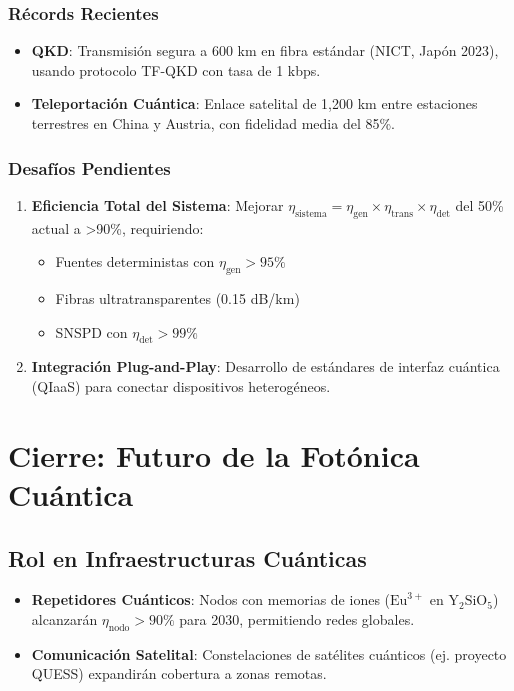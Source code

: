 \documentclass{article}
\begin{document}
\subsubsection*{Récords Recientes}

\begin{itemize}
    \item \textbf{QKD}: Transmisión segura a 600 km en fibra estándar (NICT, Japón 2023), usando protocolo TF-QKD con tasa de 1 kbps.
    \item \textbf{Teleportación Cuántica}: Enlace satelital de 1,200 km entre estaciones terrestres en China y Austria, con fidelidad media del 85\%.
\end{itemize}

\subsubsection*{Desafíos Pendientes}

\begin{enumerate}
    \item \textbf{Eficiencia Total del Sistema}: Mejorar $\eta_{\text{sistema}} = \eta_{\text{gen}} \times \eta_{\text{trans}} \times \eta_{\text{det}}$ del 50\% actual a >90\%, requiriendo:
    \begin{itemize}
        \item Fuentes deterministas con $\eta_{\text{gen}} > 95\%$
        \item Fibras ultratransparentes (0.15 dB/km)
        \item SNSPD con $\eta_{\text{det}} > 99\%$
    \end{itemize}
    
    \item \textbf{Integración Plug-and-Play}: Desarrollo de estándares de interfaz cuántica (QIaaS) para conectar dispositivos heterogéneos.
\end{enumerate}

\section*{Cierre: Futuro de la Fotónica Cuántica}

\subsection*{Rol en Infraestructuras Cuánticas}

\begin{itemize}
    \item \textbf{Repetidores Cuánticos}: Nodos con memorias de iones ($\text{Eu}^{3+}$ en $\text{Y}_2\text{SiO}_5$) alcanzarán $\eta_{\text{nodo}} > 90\%$ para 2030, permitiendo redes globales.
    \item \textbf{Comunicación Satelital}: Constelaciones de satélites cuánticos (ej. proyecto QUESS) expandirán cobertura a zonas remotas.
\end{itemize}
\end{document}
